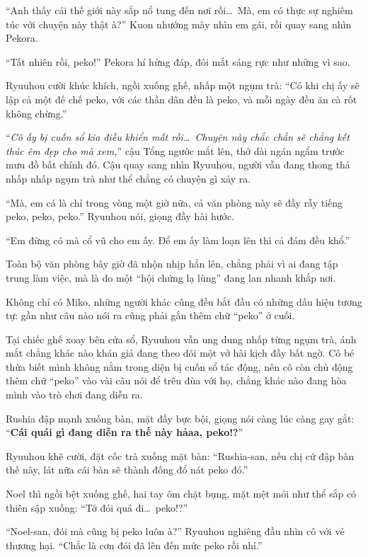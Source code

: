 \documentclass[../main.tex]{subfiles}
\begin{document}
``Anh thấy cái thế giới này sắp nổ tung đến nơi rồi\dots\ Mà, em có thực sự nghiêm túc với chuyện này thật à?'' Kuon nhướng mày nhìn em gái, rồi quay sang nhìn Pekora.

``Tất nhiên rồi, peko!'' Pekora hí hửng đáp, đôi mắt sáng rực như những vì sao.

Ryuuhou cười khúc khích, ngồi xuống ghế, nhấp một ngụm trà: ``Có khi chị ấy sẽ lập cả một đế chế peko, với các thần dân đều là peko, và mỗi ngày đều ăn cà rốt không chừng.''

``\textit{Cô ấy bị cuốn sổ kia điều khiển mất rồi\dots\ Chuyện này chắc chắn sẽ chẳng kết thúc êm đẹp cho mà xem,}'' cậu Tổng ngước mắt lên, thở dài ngán ngẩm trước mưu đồ bất chính đó. Cậu quay sang nhìn Ryuuhou, người vẫn đang thong thả nhấp nhấp ngụm trà như thể chẳng có chuyện gì xảy ra.

``Mà, em cá là chỉ trong vòng một giờ nữa, cả văn phòng này sẽ đầy rẫy tiếng peko, peko, peko.'' Ryuuhou nói, giọng đầy hài hước.

``Em đừng có mà cổ vũ cho em ấy. Để em ấy làm loạn lên thì cả đám đều khổ.''

\ct

Toàn bộ văn phòng bây giờ đã nhộn nhịp hẳn lên, chẳng phải vì ai đang tập trung làm việc, mà là do một ``hội chứng lạ lùng'' đang lan nhanh khắp nơi.

Không chỉ có Miko, những người khác cũng đều bắt đầu có những dấu hiệu tương tự: gần như câu nào nói ra cũng phải gắn thêm chữ ``peko'' ở cuối.

Tại chiếc ghế xoay bên cửa sổ, Ryuuhou vẫn ung dung nhấp từng ngụm trà, ánh mắt chẳng khác nào khán giả đang theo dõi một vở hài kịch đầy bất ngờ. Cô bé thừa biết mình không nằm trong diện bị cuốn sổ tác động, nên cô còn chủ động thêm chữ ``peko'' vào vài câu nói để trêu đùa với họ, chẳng khác nào đang hòa mình vào trò chơi đang diễn ra.

Rushia đập mạnh xuống bàn, mặt đầy bực bội, giọng nói càng lúc càng gay gắt: ``\textbf{Cái quái gì đang diễn ra thế này hảaa, peko!?}''

Ryuuhou khẽ cười, đặt cốc trà xuống mặt bàn: ``Rushia-san, nếu chị cứ đập bàn thế này, lát nữa cái bàn sẽ thành đống đổ nát peko đó.''

Noel thì ngồi bệt xuống ghế, hai tay ôm chặt bụng, mặt mệt mỏi như thể sắp có thiên sập xuống: ``Tớ đói quá đi\dots\ peko!?''

``Noel-san, đói mà cũng bị peko luôn à?'' Ryuuhou nghiêng đầu nhìn cô với vẻ thương hại. ``Chắc là cơn đói đã lên đến mức peko rồi nhỉ.''
\end{document}
